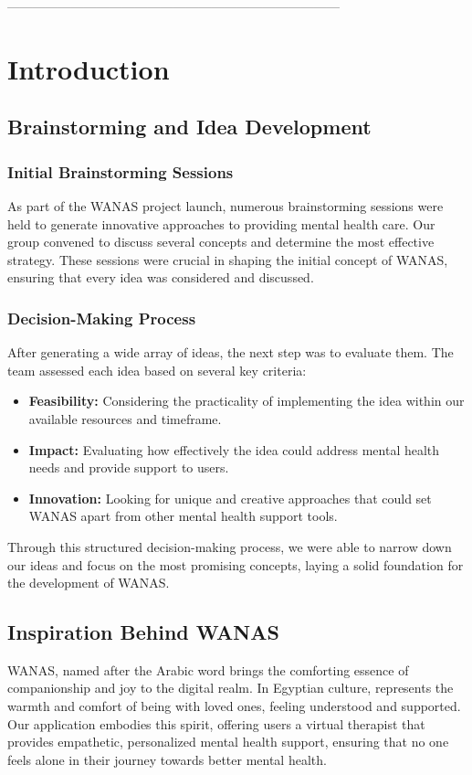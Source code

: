  ------------------------------------------------------------------------------
\chapter{Introduction}

\section{Brainstorming and Idea Development}

\subsection{Initial Brainstorming Sessions}
As part of the WANAS project launch, numerous brainstorming sessions were held to generate innovative approaches to providing mental health care. Our group convened to discuss several concepts and determine the most effective strategy. These sessions were crucial in shaping the initial concept of WANAS, ensuring that every idea was considered and discussed.

\subsection{Decision-Making Process}
After generating a wide array of ideas, the next step was to evaluate them. The team assessed each idea based on several key criteria:
\begin{itemize}
    \item \textbf{Feasibility:} Considering the practicality of implementing the idea within our available resources and timeframe.
    \item \textbf{Impact:} Evaluating how effectively the idea could address mental health needs and provide support to users.
    \item \textbf{Innovation:} Looking for unique and creative approaches that could set WANAS apart from other mental health support tools.
\end{itemize}
Through this structured decision-making process, we were able to narrow down our ideas and focus on the most promising concepts, laying a solid foundation for the development of WANAS.

\section{Inspiration Behind WANAS}
WANAS, named after the Arabic word  brings the comforting essence of companionship and joy to the digital realm. In Egyptian culture, represents the warmth and comfort of being with loved ones, feeling understood and supported. Our application embodies this spirit, offering users a virtual therapist that provides empathetic, personalized mental health support, ensuring that no one feels alone in their journey towards better mental health.

